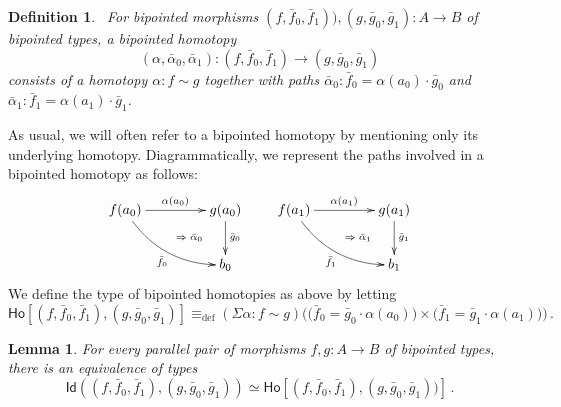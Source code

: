 \documentclass[reqno,10pt,a4paper,oneside]{amsart}
\numberwithin{equation}{section}
\theoremstyle{mythm}
\newtheorem{lemma}[theorem]{Lemma}
\theoremstyle{mydef}
\newtheorem{definition}[theorem]{Definition}
\theoremstyle{myrmk}
\newcommand{\deq}{\equiv}
\newcommand{\defeq}{\deq_{\mathrm{def}}}
\newcommand{\co}{\colon}
\newcommand{\Id}{\mathsf{Id}}
\newcommand{\Ho}{\mathsf{Ho}}
\begin{document}
\begin{definition}\ \label{def:BoolCell} For bipointed morphisms $(f, \bar{f}_0, \bar{f}_1)) , (g, \bar{g}_0, \bar{g}_1) \co A \to B$ of bipointed types, a \emph{bipointed homotopy} 
\[
(\alpha, \bar{\alpha}_0, \bar{\alpha}_1) \co (f, \bar{f}_0, \bar{f}_1) \to  (g, \bar{g}_0, \bar{g}_1)
\] 
consists of a homotopy $\alpha \co  f \sim g$ together with paths
$\bar{\alpha}_0 \co  \bar{f}_0 = \alpha(a_0)  \cdot \bar{g}_0$ and $\bar{\alpha}_1 \co \bar{f}_1 =  \alpha(a_1) \cdot \bar{g}_1$.
\end{definition}

As usual, we will often refer to a bipointed homotopy by mentioning only its underlying homotopy.
Diagrammatically, we represent the paths involved in a bipointed homotopy as follows:
\[
\xymatrix@C=1.5cm{
f(a_0) \ar[r]^{\alpha(a_0)}  \ar@/_1pc/[dr]_{\bar{f}_0}  
\ar@{}[dr]|{\qquad \Rightarrow \; \bar{\alpha}_0}  & g(a_0) \ar[d]^{\bar{g}_0}  \\ 
 & b_0 } \qquad
 \xymatrix@C=1.5cm{
f(a_1) \ar[r]^{\alpha(a_1)}  \ar@/_1pc/[dr]_{\bar{f}_1}  
\ar@{}[dr]|{\qquad \Rightarrow \; \bar{\alpha}_1}  & g(a_1) \ar[d]^{\bar{g}_1}  \\ 
 & b_1 }
 \] 
We define the type of bipointed homotopies as above by letting
\[
 \Ho   [ (f,\bar{f}_0, \bar{f}_1), (g, \bar{g}_0, \bar{g}_1)]     \defeq   
 (\Sigma \alpha \co f \sim g)  \big( \big(  
  \bar{f}_0 = \bar{g}_0 \cdot \alpha(a_0)\big) \times 
\big( \bar{f}_1=  \bar{g}_1 \cdot \alpha(a_1) \big)\big) \, .
\]


\begin{lemma} \label{BoolHomSpace}
\label{BoolHomSpace}
For every parallel pair of morphisms $f, g \co A \to B$ of bipointed types, there is an equivalence of types
\[
\Id( (f, \bar{f}_0, \bar{f}_1), (g, \bar{g}_0, \bar{g}_1) ) \simeq \Ho[ (f, \bar{f}_0, \bar{f}_1), (g, \bar{g}_0, \bar{g}_1) ) ] \, .
\]
\end{lemma}
\end{document}

